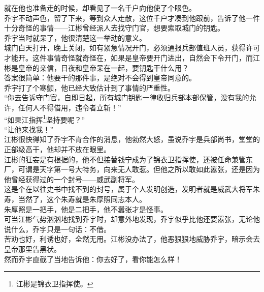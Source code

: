 \begin{multicols}{\theparacolNo}
就在他也准备走的时候，却看见了一名千户向他使了个眼色。\\

乔宇不动声色，留了下来，等到众人走散，这位千户才凑到他跟前，告诉了他一件十分奇怪的事情——江彬曾经派人去找守门官，想要索取城门的钥匙。\\

乔宇当时就呆了，他很清楚这一举动的意义。\\

城门白天打开，晚上关闭，如有紧急情况开门，必须通报兵部值班人员，获得许可才能开。这件事情奇怪就奇怪在，如果是皇帝要开门进出，自然会下令开门，而江彬是皇帝的亲信，日夜和皇帝呆在一起，要钥匙干什么用？\\

答案很简单：他要干的那件事，是绝对不会得到皇帝同意的。\\

乔宇打了个寒颤，他已经大致估计到了事情的严重性。\\

“你去告诉守门官，自即日起，所有城门钥匙一律收归兵部本部保管，没有我的允许，任何人不得借用，违令者立斩！”\\

“如果江指挥\footnote{江彬是锦衣卫指挥使。}坚持要呢？”\\

“让他来找我！”\\

江彬很快得知了乔宇不肯合作的消息，他勃然大怒，虽说乔宇是兵部尚书，堂堂的正部级高干，他却并不放在眼里。\\

江彬的狂妄是有根据的，他不但接替钱宁成为了锦衣卫指挥使，还被任命兼管东厂，可谓是天字第一号大特务，向来无人敢惹。但他之所以敢如此嚣张，还是因为他曾经获得过的一个封号——威武副将军。\\

这是个在以往史书中找不到的封号，属于个人发明创造，发明者就是威武大将军朱寿，当然了，这个朱寿就是朱厚照同志本人。\\

朱厚照是一把手，他是二把手，他不嚣张才是怪事。\\

可当江彬气势汹汹地找到乔宇时，却意外地发现，乔宇似乎比他还要嚣张，无论他说什么，乔宇只是一句话：不借。\\

苦劝也好，利诱也好，全然无用。江彬没办法了，他恶狠狠地威胁乔宇，暗示会去皇帝那里告黑状。\\

然而乔宇直截了当地告诉他：你去好了，看你能怎么样！\\


\end{multicols}
